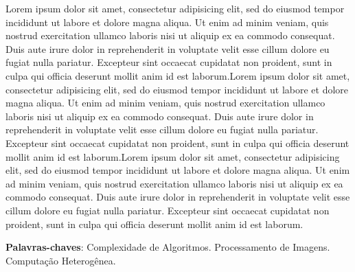 \documentclass[
	12pt,				%
	openright,			%
	oneside,			%
	a4paper,			%
	chapter=TITLE,		%
	section=TITLE,		%
	english,			%
	brazil				%
	]{abntex2}
\begin{document}

\setlength{\absparsep}{18pt} %
\begin{resumo}
	Lorem ipsum dolor sit amet, consectetur adipisicing elit, sed do eiusmod
	tempor incididunt ut labore et dolore magna aliqua. Ut enim ad minim veniam,
	quis nostrud exercitation ullamco laboris nisi ut aliquip ex ea commodo
	consequat. Duis aute irure dolor in reprehenderit in voluptate velit esse
	cillum dolore eu fugiat nulla pariatur. Excepteur sint occaecat cupidatat non
	proident, sunt in culpa qui officia deserunt mollit anim id est laborum.Lorem ipsum dolor sit amet, consectetur adipisicing elit, sed do eiusmod
	tempor incididunt ut labore et dolore magna aliqua. Ut enim ad minim veniam,
	quis nostrud exercitation ullamco laboris nisi ut aliquip ex ea commodo
	consequat. Duis aute irure dolor in reprehenderit in voluptate velit esse
	cillum dolore eu fugiat nulla pariatur. Excepteur sint occaecat cupidatat non
	proident, sunt in culpa qui officia deserunt mollit anim id est laborum.Lorem ipsum dolor sit amet, consectetur adipisicing elit, sed do eiusmod
	tempor incididunt ut labore et dolore magna aliqua. Ut enim ad minim veniam,
	quis nostrud exercitation ullamco laboris nisi ut aliquip ex ea commodo
	consequat. Duis aute irure dolor in reprehenderit in voluptate velit esse
	cillum dolore eu fugiat nulla pariatur. Excepteur sint occaecat cupidatat non
	proident, sunt in culpa qui officia deserunt mollit anim id est laborum.

 \textbf{Palavras-chaves}: Complexidade de Algoritmos. Processamento de Imagens. Computação Heterogênea.
\end{resumo}
\end{document}
